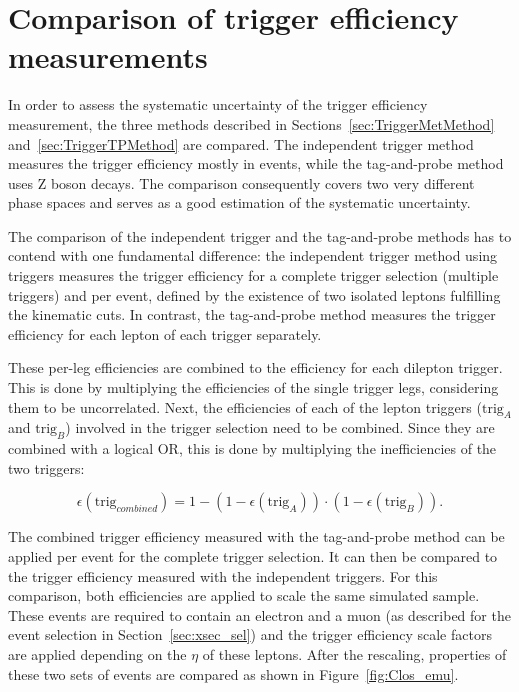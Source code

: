 

\section{Comparison of trigger efficiency measurements}
\label{sec:TriggerComp}

In order to assess the systematic uncertainty of the trigger efficiency measurement, the three methods described in Sections~\ref{sec:TriggerMetMethod} and~\ref{sec:TriggerTPMethod} are compared.
The independent trigger method measures the trigger efficiency mostly in \ttbar events, while the tag-and-probe method uses Z boson decays. The comparison consequently covers two 
very different phase spaces and serves as a good estimation of the systematic uncertainty.

The comparison of the independent trigger and the tag-and-probe methods has to contend with one fundamental difference: the independent trigger method using \ETm triggers measures the trigger efficiency for a complete trigger selection (multiple triggers) and per event, defined by the existence of two isolated leptons fulfilling the kinematic cuts. In contrast, the tag-and-probe method measures the trigger efficiency for each lepton of each trigger separately. 

These per-leg efficiencies are combined to the efficiency for each dilepton trigger. This is done by multiplying the efficiencies of the single trigger legs, considering them to be uncorrelated. 
Next, the efficiencies of each of the lepton triggers ($\mathrm{trig}_A$ and $\mathrm{trig}_B$) involved in the trigger selection need to be combined. Since they are combined with a logical OR, this is done by multiplying the inefficiencies of the two triggers:

\begin{equation}
\epsilon(\mathrm{trig}_{combined}) = 1- (1-\epsilon(\mathrm{trig}_A))\cdot(1- \epsilon(\mathrm{trig}_B)).
\label{eq:TPcombine}
\end{equation}

The combined trigger efficiency measured with the tag-and-probe method can be applied per event for the complete trigger selection. It can then be compared to the trigger efficiency measured with the independent \ETm triggers.
For this comparison, both efficiencies are applied to scale the same simulated \ttbar sample. These \ttbar events are required to contain an electron and a muon (as described for the event selection in Section~\ref{sec:xsec_sel}) and the trigger efficiency scale factors are applied depending on the $\eta$ of these leptons.
After the rescaling, properties of these two sets of \ttbar events are compared as shown in Figure~\ref{fig:Clos_emu}.

